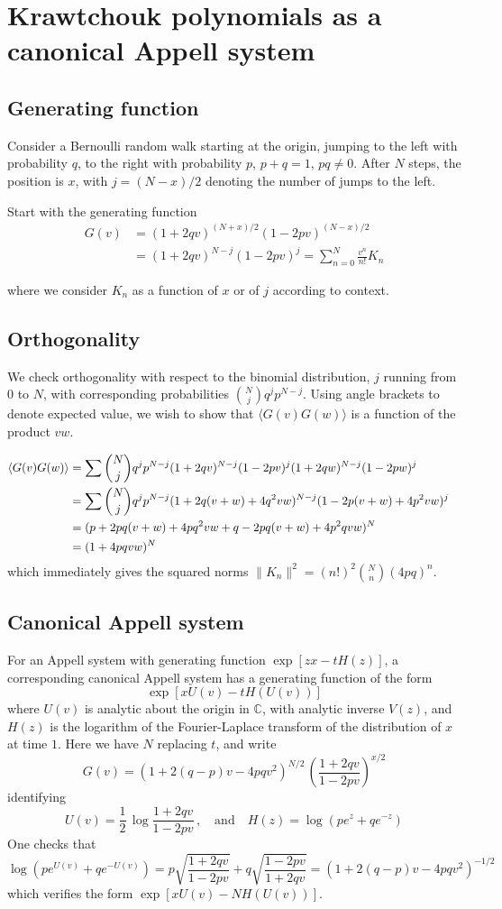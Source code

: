 \documentclass[runningheads]{llncs}
\def\avg#1.{\langle #1\rangle}
\def\C{\mathbb C}
\def\half{\frac12}
\begin{document}
\section{Krawtchouk polynomials as a canonical Appell system}
\subsection{Generating function}
Consider a Bernoulli random walk starting at the origin, jumping to the left with probability $q$, to the right with probability $p$, $p+q=1$, $pq\ne0$.
After $N$ steps, the position is $x$, with $j=(N-x)/2$ denoting the number of jumps to the left.\bigskip

Start with the generating function
\begin{align*}
G(v)&=(1+2qv)^{(N+x)/2}(1-2pv)^{(N-x)/2}\\ &=(1+2qv)^{N-j}(1-2pv)^j=\sum_{n=0}^N \frac{v^n}{n!}K_n
\end{align*}

where we consider $K_n$ as a function of $x$ or of $j$ according to context. \bigskip

\subsection{Orthogonality}\label{sec:ortho}
We check orthogonality with respect to the binomial distribution, $j$ running from $0$ to $N$, with corresponding probabilities 
$\displaystyle \binom{N}{j}q^jp^{N-j}$. Using angle brackets to denote expected value, we wish to show that
$\avg G(v)G(w).$ is a function of the product $vw$. 

\begin{align*}
\avg G(v)G(w).&=\sum\binom{N}{j}q^jp^{N-j}(1+2qv)^{N-j}(1-2pv)^j(1+2qw)^{N-j}(1-2pw)^j\cr
&=\sum\binom{N}{j}q^jp^{N-j}(1+2q(v+w)+4q^2vw)^{N-j}(1-2p(v+w)+4p^2vw)^{j}\cr
&=(p+2pq(v+w)+4pq^2vw+q-2pq(v+w)+4p^2qvw)^N\cr &=(1+4pqvw)^N
\end{align*}
which immediately gives the squared norms $\|K_n\|^2=(n!)^2\binom{N}{n}(4pq)^n$.
\subsection{Canonical Appell system}
For an Appell system with generating function $\exp[zx-tH(z)]$, a corresponding canonical Appell system has a generating function of the form
$$\exp[xU(v)-tH(U(v))]$$
where $U(v)$ is analytic about the origin in $\C$, with analytic inverse $V(z)$, and $H(z)$ is the logarithm of the Fourier-Laplace transform
of the distribution of $x$ at time $1$. Here we have $N$ replacing $t$, and write
$$G(v)=(1+2(q-p)v-4pqv^2)^{N/2}\,\left(\frac{1+2qv}{1-2pv}\right)^{x/2}$$
identifying
$$U(v)=\half\,\log\frac{1+2qv}{1-2pv}\,,\quad \text{and}\quad H(z)=\log(pe^z+qe^{-z})$$
One checks that
$$\log(pe^{U(v)}+qe^{-U(v)})=p\sqrt{\frac{1+2qv}{1-2pv}}+q\sqrt{\frac{1-2pv}{1+2qv}} =(1+2(q-p)v-4pqv^2)^{-1/2}$$
which verifies the form $\exp[xU(v)-NH(U(v))]$.\bigskip
\end{document}
